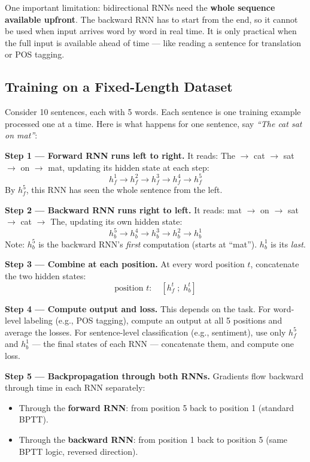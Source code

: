 \documentclass[12pt,a4paper]{article}
\begin{document}
One important limitation: bidirectional RNNs need the \textbf{whole sequence available upfront}. The backward RNN has to start from the end, so it cannot be used when input arrives word by word in real time. It is only practical when the full input is available ahead of time --- like reading a sentence for translation or POS tagging.


\subsection{Training on a Fixed-Length Dataset}

Consider 10 sentences, each with 5 words. Each sentence is one training example processed one at a time. Here is what happens for one sentence, say \textit{``The cat sat on mat''}:

\textbf{Step 1 --- Forward RNN runs left to right.}
It reads: The $\rightarrow$ cat $\rightarrow$ sat $\rightarrow$ on $\rightarrow$ mat, updating its hidden state at each step:
\[
h_f^1 \rightarrow h_f^2 \rightarrow h_f^3 \rightarrow h_f^4 \rightarrow h_f^5
\]
By $h_f^5$, this RNN has seen the whole sentence from the left.

\textbf{Step 2 --- Backward RNN runs right to left.}
It reads: mat $\rightarrow$ on $\rightarrow$ sat $\rightarrow$ cat $\rightarrow$ The, updating its own hidden state:
\[
h_b^5 \rightarrow h_b^4 \rightarrow h_b^3 \rightarrow h_b^2 \rightarrow h_b^1
\]
Note: $h_b^5$ is the backward RNN's \textit{first} computation (starts at ``mat''). $h_b^1$ is its \textit{last}.

\textbf{Step 3 --- Combine at each position.}
At every word position $t$, concatenate the two hidden states:
\[
\text{position } t: \quad [h_f^t \; ; \; h_b^t]
\]

\textbf{Step 4 --- Compute output and loss.}
This depends on the task. For word-level labeling (e.g., POS tagging), compute an output at all 5 positions and average the losses. For sentence-level classification (e.g., sentiment), use only $h_f^5$ and $h_b^1$ --- the final states of each RNN --- concatenate them, and compute one loss.

\textbf{Step 5 --- Backpropagation through both RNNs.}
Gradients flow backward through time in each RNN separately:
\begin{itemize}
    \item Through the \textbf{forward RNN}: from position 5 back to position 1 (standard BPTT).
    \item Through the \textbf{backward RNN}: from position 1 back to position 5 (same BPTT logic, reversed direction).
\end{itemize}
\end{document}
